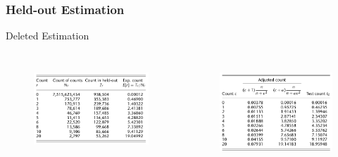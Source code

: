 \documentclass{beamer}
\begin{document}
\begin{frame}\frametitle{Held-out Estimation}

{Deleted Estimation}

\begin{columns}[c] %

\begin{figure}
\includegraphics[width=0.9\linewidth]{figure/deleted_estimation.pdf}
\label{fig:deleted_estimation}
\end{figure}


\begin{figure}
\includegraphics[width=0.9\linewidth]{figure/test_count.pdf}
\label{fig:test_acount}
\end{figure}

\end{columns}

\end{frame}
\end{document}
